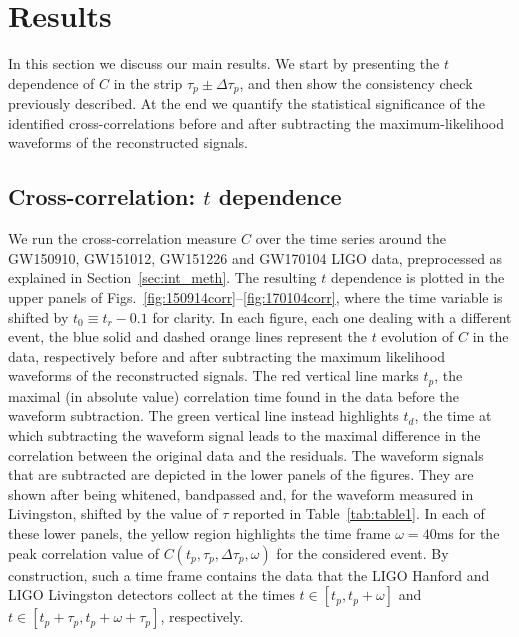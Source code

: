 \documentclass[a4paper,11pt]{article}
\begin{document}
\section{Results}
\label{sec:results}

In this section we discuss our main results. We start by presenting the $t$ dependence of $C$ in the strip $\tau_p \pm \Delta \tau_p$,
and then show the consistency check previously described. At the end we quantify the statistical significance of the identified cross-correlations before and after subtracting the maximum-likelihood waveforms of the reconstructed signals.


\subsection{Cross-correlation: $t$ dependence} 
\label{sec:t-dep}

We run the cross-correlation measure $C$ over the time series around the GW150910, GW151012, 
GW151226 and GW170104 LIGO data, preprocessed as explained in Section~\ref{sec:int_meth}.  The resulting $t$ dependence is plotted in the upper panels of Figs.~\ref{fig:150914corr}--\ref{fig:170104corr}, where the time variable is shifted by $t_0 \equiv t_r - 0.1$ for clarity. In each figure, each one dealing with a different event, the blue solid and dashed orange lines represent the $t$ evolution of $C$ in the data, respectively before and after subtracting the maximum likelihood waveforms of the reconstructed signals. The red vertical line marks $t_p$, the maximal (in absolute value) correlation time found in the data before the waveform subtraction. The green vertical line instead highlights $t_d$, the time at which subtracting the waveform signal leads to the maximal difference in the correlation between the original data and the residuals.
The waveform signals that are subtracted are depicted in the lower panels of the figures. They are shown after being whitened, bandpassed and, for the waveform measured in Livingston, shifted by the value of $\tau$ reported in Table~\ref{tab:table1}. In each of these lower panels, the yellow region highlights the time frame $\omega = 40$ms for the peak correlation value of $C(t_p, \tau_p, \Delta \tau_p, \omega)$ for the considered event.  By construction, such a time frame contains the data that the LIGO Hanford and LIGO Livingston detectors collect at the times $t \in [t_p,t_p+\omega]$ and $t \in [t_p+\tau_p,t_p+\omega+\tau_p]$, respectively.
\end{document}

